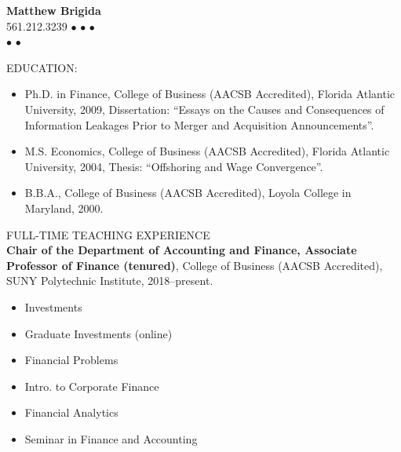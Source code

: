 \documentclass[9pt]{article}
\begin{document}
\fontsize{9}{11}\selectfont
\begin{center}
{\bf  {\Large Matthew Brigida}}\\
\hspace*{22pt}561.212.3239 $\bullet$ \href{mailto: matthew.brigida@sunyit.edu}{} $\bullet$
\href{https://github.com/Matt-Brigida}{\color{Blue}{GitHub}} $\bullet$
\href{https://www.youtube.com/channel/UCwekb0vAK-FKaqPF5gfd0eQ?view_as=subscriber}{\color{Blue}{YouTube}}\\
\hspace*{22pt} \href{https://github.com/Matt-Brigida/job_market_materials/raw/master/teaching_phil/teaching_phil.pdf}{\color{Blue}{Statement of Teaching Philosophy}} $\bullet$ \href{https://github.com/Matt-Brigida/job_market_materials/raw/master/Evidence_teaching_effectiveness/Brigida_evidence_teaching_effectiveness.pdf}{\color{Blue}{Evidence of Teaching Effectiveness}} $\bullet$ \href{https://github.com/Matt-Brigida/job_market_materials/raw/master/research_phil/research_phil.pdf}{\color{Blue}{Statement of Research Philosophy}}
\end{center}
EDUCATION:
\begin{itemize}[noitemsep, nolistsep]
\item Ph.D. in Finance, College of Business (AACSB Accredited), Florida Atlantic University, 2009, Dissertation:
``Essays on the Causes and Consequences of Information Leakages Prior to Merger and Acquisition
Announcements''.
\item M.S. Economics, College of Business (AACSB Accredited), Florida Atlantic University, 2004, Thesis: ``Offshoring
and Wage Convergence''.
\item B.B.A., College of Business (AACSB Accredited), Loyola College in Maryland, 2000.
\end{itemize}
\vspace{10pt}
FULL-TIME TEACHING EXPERIENCE\\
{\bf Chair of the Department of Accounting and Finance, Associate Professor of Finance (tenured)}, College of Business (AACSB Accredited), SUNY Polytechnic Institute, 2018--present.
\begin{itemize}[noitemsep, nolistsep]
\item Investments
\item Graduate Investments (online)
\item Financial Problems
\item Intro. to Corporate Finance
\item Financial Analytics
\item Seminar in Finance and Accounting
\end{itemize}
\end{document}
